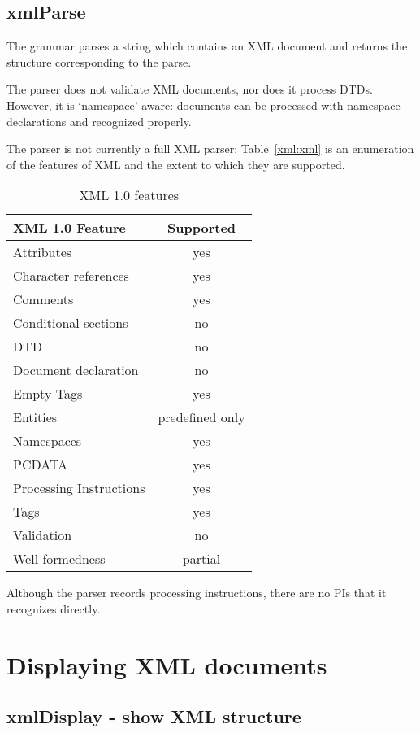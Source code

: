 \subsection{xmlParse}


The  grammar parses a string which contains an XML document and returns the  structure corresponding to the parse.

The  parser does not validate XML documents, nor does it process DTDs. However, it is `namespace' aware: documents can be processed with namespace declarations and recognized properly.

The parser is not currently a full XML parser; Table~\vref{xml:xml} is an enumeration of the features of XML and the extent to which they are supported.
\begin{table}[h]
\begin{center}
\begin{tabular}{|l|c|}
\hline
XML 1.0 Feature&Supported\\
\hline
Attributes&yes\\
Character references&yes\\
Comments&yes\\
Conditional sections&no\\
DTD&no\\
Document declaration&no\\
Empty Tags&yes\\
Entities&predefined only\\
Namespaces&yes\\
PCDATA&yes\\
Processing Instructions&yes\\
Tags&yes\\
Validation&no\\
Well-formedness&partial\\
\hline
\end{tabular}
\end{center}
\caption{XML 1.0 features}\label{xml:xml}
\end{table}
Although the parser records processing instructions, there are no PIs that it recognizes directly.

\section{Displaying XML documents}

\subsection{xmlDisplay - show XML structure}
\label{xml:display}

